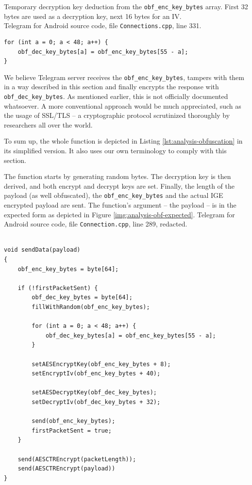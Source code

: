 \documentclass[thesis=M,english]{FITthesis}[2012/10/20]
\begin{document}
\begin{listing}[htb]
\caption{Temporary decryption key deduction from the \texttt{obf\_enc\_key\_bytes} array. First 32 bytes are used as a decryption key, next 16 bytes for an IV.
\protect \\ Telegram for Android source code, file \texttt{Connections.cpp}, line 331.}
\label{lst:code-obf-dec}
\begin{verbatim}
for (int a = 0; a < 48; a++) {
    obf_dec_key_bytes[a] = obf_enc_key_bytes[55 - a];
}
\end{verbatim}
\end{listing}


We believe Telegram server receives the \texttt{obf\_enc\_key\_bytes}, tampers with them in a way described in this section and finally encrypts the response with \texttt{obf\_dec\_key\_bytes}. As mentioned earlier, this is not officially documented whatsoever. A more conventional approach would be much appreciated,  such as the usage of SSL/TLS -- a cryptographic protocol scrutinized thoroughly by researchers all over the world.

To sum up, the whole function is depicted in Listing \ref{lst:analysis-obfuscation} in its simplified version. It also uses our own terminology to comply with this section.

\begin{listing}[htb]
\caption{The function starts by generating random bytes. The decryption key is then derived, and both encrypt and decrypt keys are set. Finally, the length of the payload (as well obfuscated), the \texttt{obf\_enc\_key\_bytes} and the actual IGE encrypted payload are sent. The function's argument -- the payload -- is in the expected form as depicted in Figure \ref{img:analysis-obf-expected}.
\protect\linebreak Telegram for Android source code, file \texttt{Connection.cpp}, line 289, redacted.}
\label{lst:analysis-obfuscation}
\begin{verbatim}

void sendData(payload)
{
    obf_enc_key_bytes = byte[64];

    if (!firstPacketSent) {
        obf_dec_key_bytes = byte[64];
        fillWithRandom(obf_enc_key_bytes);

        for (int a = 0; a < 48; a++) {
            obf_dec_key_bytes[a] = obf_enc_key_bytes[55 - a];
        }

        setAESEncryptKey(obf_enc_key_bytes + 8);
        setEncryptIv(obf_enc_key_bytes + 40);

        setAESDecryptKey(obf_dec_key_bytes);
        setDecryptIv(obf_dec_key_bytes + 32);
        
        send(obf_enc_key_bytes);
        firstPacketSent = true;
    }

    send(AESCTREncrypt(packetLength));
    send(AESCTREncrypt(payload))
}
\end{verbatim}
\end{listing}
\end{document}
